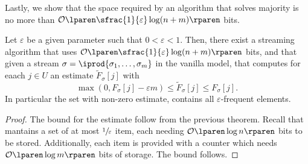 \documentclass{subfiles}
\begin{document}
    Lastly, we show that the space required by an algorithm that solves majority is no more than 
        \(\ofO{\sfrac{1}{\varepsilon} \log(n + m)}\) bits.
        \begin{lemma}
            Let \(\varepsilon\) be a given parameter such that \(0 < \varepsilon < 1\).
            Then, there exist a streaming algorithm that uses \(\ofO{\sfrac{1}{\varepsilon} \log(n + m)}\) bits,
            and that given a stream \(\sigma = \iprod{\sigma_{1}, \ldots, \sigma_{m}}\) in the vanilla model,
            that computes for eaach \(j \in U\) an estimate \(\tilde{F}_{\sigma}[j]\) with 
            \[
                \max(0, F_{\sigma}[j] - \varepsilon m) \le \tilde{F}_{\sigma}[j] \le F_{\sigma}[j].
            \]
            In particular the set with non-zero estimate, contains all \(\varepsilon\)-frequent elements.
        \end{lemma}
        \begin{proof}
            The bound for the estimate follow from the previous theorem.
            Recall that  mantains a set of at most \(\sfrac{1}{\varepsilon}\)
            item, each needing \(\ofO{\log n}\) bits to be stored.
            Additionally, each item is provided with a counter which needs \(\ofO{\log m}\) bits of storage.
            The bound follows.
        \end{proof}
\end{document}
